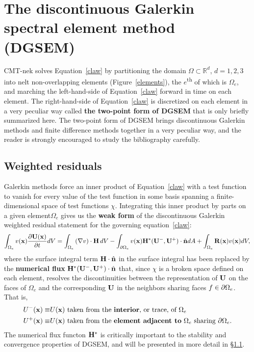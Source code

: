 \section{The discontinuous Galerkin spectral element method (DGSEM)\label{sec:dgsem}}
CMT-nek solves Equation~\ref{claw} by partitioning the
domain $\Omega \subset \mathbb{R}^d$, $d={1,2,3}$  into nelt non-overlapping elements (Figure~\ref{elements}),
the $e$\textsuperscript{th} of which is $\Omega_e$,
and marching the left-hand-side of Equation~\ref{claw} forward in time on
each element. The right-hand-side of Equation~\ref{claw} is discretized on
each element in a very peculiar way called \textbf{the two-point form of DGSEM}
that is only briefly summarized here.
The two-point form of DGSEM brings discontinuous Galerkin methods and finite
difference methods together in a very peculiar way, and the reader is strongly encouraged to study the bibliography carefully.

\subsection{Weighted residuals\label{sec:wrt}}
Galerkin methods force an inner product of Equation~\ref{claw} with a test function to vanish
for every value of the test function in some basis spanning a finite-dimensional
space of test functions $\chi$.
Integrating this inner product by parts on a given element$\Omega_e$ gives us the \textbf{weak form} of the discontinuous Galerkin weighted residual
statement for the governing equation~\ref{claw}:
\begin{equation}
\int_{\Omega_e} v({\bf x}) \frac{\partial {\bf U}({\bf x})}{\partial t}dV = 
\int_{\Omega_e} \left(\nabla v\right) \cdot {\bf H}\, dV  
-\int_{\partial \Omega_e} v({\bf x}) {\bf H}^{\ast}({\bf U}^-,{\bf U}^+) \cdot {\hat {\bf n}} dA +
\int_{\Omega_e} \mathbf{R}({\bf x}) v({\bf x}) dV,
\label{dghweak}
\end{equation}
where the surface integral term ${\bf H}\cdot{\hat {\bf n}}$ in the surface integral has been replaced by
the \textbf{numerical flux} ${\bf H}^{\ast}({\bf U}^-,{\bf U}^+)\cdot {\hat {\bf n}}$ that, since $\chi$
is a broken space defined on each element, resolves the discontinuities between
the representation of ${\bf U}$ on the faces of $\Omega_e$ and the corresponding ${\bf U}$
in the neighbors sharing faces $f \in \partial \Omega_e$. That is,
\begin{align}
   U^-({\bf x}) \equiv & U({\bf x}) \mbox{ taken from the \textbf{interior}, or trace, of }\Omega_e \label{uminus}\\
   U^+({\bf x}) \equiv & U({\bf x}) \mbox{ taken from the \textbf{element adjacent to} }\Omega_e\mbox{ sharing }\partial \Omega_e. \label{uplus}
\end{align}
The numerical flux functon ${\bf H}^{\ast}$ is critically important to the stability
and convergence properties of DGSEM, and will be presented in more detail in
\S\ref{}.

